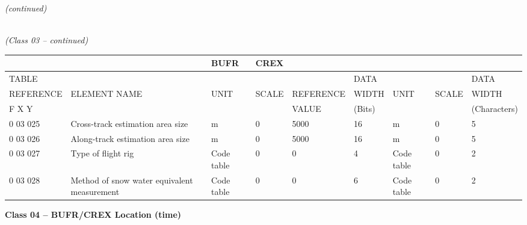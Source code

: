 \emph{(continued)}

\emph{\\
(Class 03 -- continued)}

\begin{longtable}[]{@{}lllllllll@{}}
\toprule
& & BUFR & CREX & & & & &\tabularnewline
\midrule
\endhead
TABLE & & & & & DATA & & & DATA\tabularnewline
REFERENCE & ELEMENT NAME & UNIT & SCALE & REFERENCE & WIDTH & UNIT & SCALE & WIDTH\tabularnewline
F X Y & & & & VALUE & (Bits) & & & (Characters)\tabularnewline
0 03 025 & Cross-track estimation area size & m & 0 & 5000 & 16 & m & 0 & 5\tabularnewline
0 03 026 & Along-track estimation area size & m & 0 & 5000 & 16 & m & 0 & 5\tabularnewline
0 03 027 & Type of flight rig & Code table & 0 & 0 & 4 & Code table & 0 & 2\tabularnewline
0 03 028 & Method of snow water equivalent measurement & Code table & 0 & 0 & 6 & Code table & 0 & 2\tabularnewline
\bottomrule
\end{longtable}

\textbf{Class 04 -- BUFR/CREX Location (time)}

